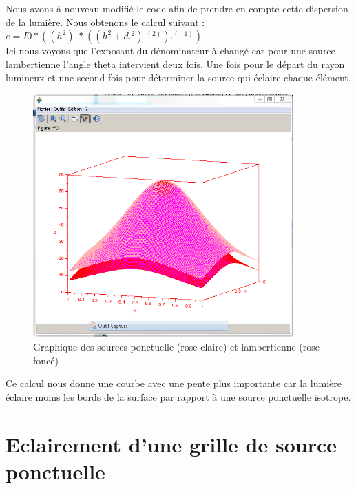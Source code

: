 \documentclass{article}
\begin{document}
  \newpage
  
  Nous avons à nouveau modifié le code afin de prendre en compte cette dispersion de la 
  lumière. Nous obtenons le calcul suivant :
  $ e = I0 * ((h^2) .* ((h^2 + d.^2).^(2)).^(-1)) $\\
  
  Ici nous voyons que l'exposant du dénominateur à changé car pour une source lambertienne 
  l'angle theta intervient deux fois. Une fois pour le départ du rayon lumineux et une second 
  fois pour déterminer la source qui éclaire chaque élément.\\
  
  \begin{figure}[!h]
    \begin{center}
      \includegraphics[width=10cm]{../iso_lamb.PNG}
      \caption{Graphique des sources ponctuelle (rose claire) et lambertienne (rose foncé)}
    \end{center}
  \end{figure}
  
  \newpage
  
  Ce calcul nous donne une courbe avec une pente plus importante car la lumière éclaire moins
  les bords de la surface par rapport à une source ponctuelle isotrope.\\
  
  \section{Eclairement d'une grille de source ponctuelle}
    
\end{document}
